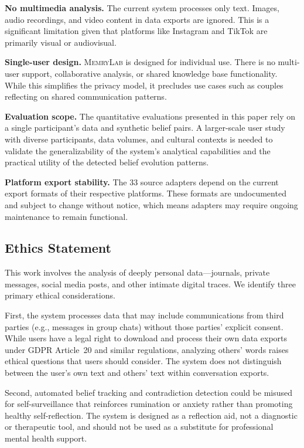 \documentclass[manuscript,review]{acmart}
\begin{document}
\textbf{No multimedia analysis.}
The current system processes only text.
Images, audio recordings, and video content in data exports are ignored.
This is a significant limitation given that platforms like Instagram and TikTok are primarily visual or audiovisual.

\textbf{Single-user design.}
\textsc{MemryLab} is designed for individual use.
There is no multi-user support, collaborative analysis, or shared knowledge base functionality.
While this simplifies the privacy model, it precludes use cases such as couples reflecting on shared communication patterns.

\textbf{Evaluation scope.}
The quantitative evaluations presented in this paper rely on a single participant's data and synthetic belief pairs.
A larger-scale user study with diverse participants, data volumes, and cultural contexts is needed to validate the generalizability of the system's analytical capabilities and the practical utility of the detected belief evolution patterns.

\textbf{Platform export stability.}
The 33 source adapters depend on the current export formats of their respective platforms.
These formats are undocumented and subject to change without notice, which means adapters may require ongoing maintenance to remain functional.

\subsection{Ethics Statement}
\label{sec:ethics}

This work involves the analysis of deeply personal data---journals, private messages, social media posts, and other intimate digital traces.
We identify three primary ethical considerations.

First, the system processes data that may include communications from third parties (e.g., messages in group chats) without those parties' explicit consent.
While users have a legal right to download and process their own data exports under GDPR Article~20 and similar regulations, analyzing others' words raises ethical questions that users should consider.
The system does not distinguish between the user's own text and others' text within conversation exports.

Second, automated belief tracking and contradiction detection could be misused for self-surveillance that reinforces rumination or anxiety rather than promoting healthy self-reflection.
The system is designed as a reflection aid, not a diagnostic or therapeutic tool, and should not be used as a substitute for professional mental health support.
\end{document}
